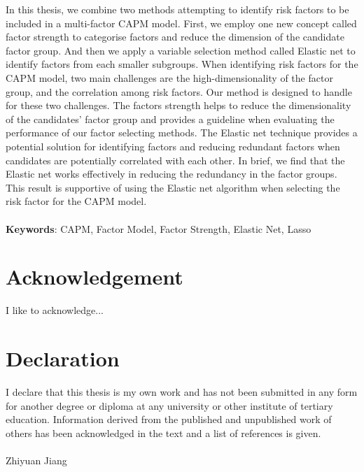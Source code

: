 In this thesis, we combine two methods attempting to identify risk factors to be included in a multi-factor CAPM model.
First, we employ one new concept called factor strength to categorise factors and reduce the dimension of the candidate factor group.
And then we apply a variable selection method called Elastic net to identify factors from each smaller subgroups.
When identifying risk factors for the CAPM model, two main challenges are the high-dimensionality of the factor group, and the correlation among risk factors.
Our method is designed to handle for these two challenges. 
The factors strength helps to reduce the dimensionality of the candidates' factor group and provides a guideline when evaluating the performance of our factor selecting methods.
The Elastic net technique provides a potential solution for identifying factors and reducing redundant factors when candidates are potentially correlated with each other.
In brief, we find that the Elastic net works effectively in reducing the redundancy in the factor groups.
This result is supportive of using the Elastic net algorithm when selecting the risk factor for the CAPM model.\\
\vspace{0.5cm}\\
 \textbf{Keywords}: CAPM, Factor Model, Factor Strength, Elastic Net, Lasso


\chapter*{Acknowledgement}
I like to acknowledge...

\chapter*{Declaration}
I declare that this thesis is my own work and has not been submitted in any form for another degree or diploma at any university or other institute of tertiary education. Information derived from the published and unpublished work of others has been acknowledged in the text and a list of references is given.\\
\vspace{0.7cm}\\
Zhiyuan Jiang

